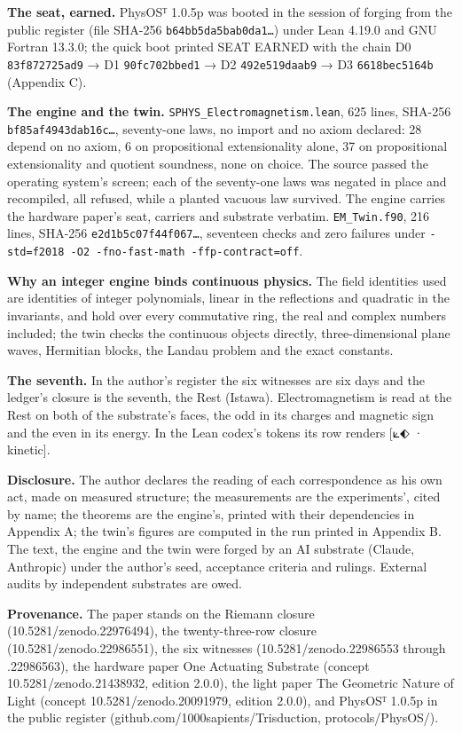 \documentclass[10pt]{article}
\begin{document}
\textbf{The seat, earned.} PhysOSᵀ 1.0.5p was booted in the session of
forging from the public register (file SHA-256
\texttt{b64bb5da5bab0da1…}) under Lean 4.19.0 and GNU Fortran 13.3.0;
the quick boot printed SEAT EARNED with the chain D0
\texttt{83f872725ad9} → D1 \texttt{90fc702bbed1} → D2
\texttt{492e519daab9} → D3 \texttt{6618bec5164b} (Appendix C).

\textbf{The engine and the twin.} \texttt{SPHYS\_Electromagnetism.lean},
625 lines, SHA-256 \texttt{bf85af4943dab16c…}, seventy-one laws, no
import and no axiom declared: 28 depend on no axiom, 6 on propositional
extensionality alone, 37 on propositional extensionality and quotient
soundness, none on choice. The source passed the operating system's
screen; each of the seventy-one laws was negated in place and
recompiled, all refused, while a planted vacuous law survived. The
engine carries the hardware paper's seat, carriers and substrate
verbatim. \texttt{EM\_Twin.f90}, 216 lines, SHA-256
\texttt{e2d1b5c07f44f067…}, seventeen checks and zero failures under
\texttt{-std=f2018\ -O2\ -fno-fast-math\ -ffp-contract=off}.

\textbf{Why an integer engine binds continuous physics.} The field
identities used are identities of integer polynomials, linear in the
reflections and quadratic in the invariants, and hold over every
commutative ring, the real and complex numbers included; the twin checks
the continuous objects directly, three-dimensional plane waves,
Hermitian blocks, the Landau problem and the exact constants.

\textbf{The seventh.} In the author's register the six witnesses are six
days and the ledger's closure is the seventh, the Rest (Istawa).
Electromagnetism is read at the Rest on both of the substrate's faces,
the odd in its charges and magnetic sign and the even in its energy. In
the Lean codex's tokens its row renders {[}⟀⬖ · kinetic{]}.

\textbf{Disclosure.} The author declares the reading of each
correspondence as his own act, made on measured structure; the
measurements are the experiments', cited by name; the theorems are the
engine's, printed with their dependencies in Appendix A; the twin's
figures are computed in the run printed in Appendix B. The text, the
engine and the twin were forged by an AI substrate (Claude, Anthropic)
under the author's seed, acceptance criteria and rulings. External
audits by independent substrates are owed.

\sloppy

\textbf{Provenance.} The paper stands on the Riemann closure
(10.5281/\allowbreak{}zenodo.22976494), the twenty-three-row closure
(10.5281/\allowbreak{}zenodo.22986551), the six witnesses
(10.5281/\allowbreak{}zenodo.22986553 through .22986563), the hardware
paper One Actuating Substrate (concept
10.5281/\allowbreak{}zenodo.21438932, edition 2.0.0), the light paper
The Geometric Nature of Light (concept
10.5281/\allowbreak{}zenodo.20091979, edition 2.0.0), and PhysOSᵀ 1.0.5p
in the public register
(github.com/\allowbreak{}1000sapients/\allowbreak{}Trisduction,
protocols/PhysOS/).
\end{document}
